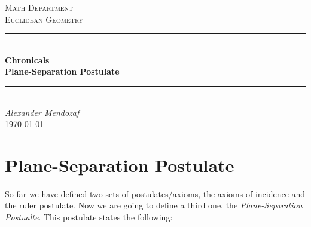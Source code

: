 \documentclass[11pt]{article}
\begin{document}
    \begin{titlepage}

        \newcommand{\HRule}{\rule{\linewidth}{0.5mm}}
        \newcommand{\department}{Math Department}
        \newcommand{\course}{Euclidean Geometry}
        \newcommand{\titleValue}{Chronicals}
        \newcommand{\subtitleValue}{Plane-Separation Postulate}
        \newcommand{\authorName}{Alexander Mendozaf}

        \center


        \vspace{0.5cm}
        \textsc{\Large \department}\\[0.5cm]
        \textsc{\Large \course}\\[0.5cm]
        \vfill


        \HRule\\
        \Huge
        \textbf{\titleValue}\\[0.5cm]
        \Large
        \textbf{\subtitleValue}\\
        \HRule\\[0.5cm]


        \vfill
        \Large
        \textit{\authorName}\\
        {\large \today}\\[2cm]

    \end{titlepage}
\section{Plane-Separation Postulate}
    So far we have defined two sets of postulates/axioms, the axioms of incidence and the ruler postulate. Now we are going to define a third one, the \textit{Plane-Separation Postualte}. This postulate states the following:\\
\end{document}
